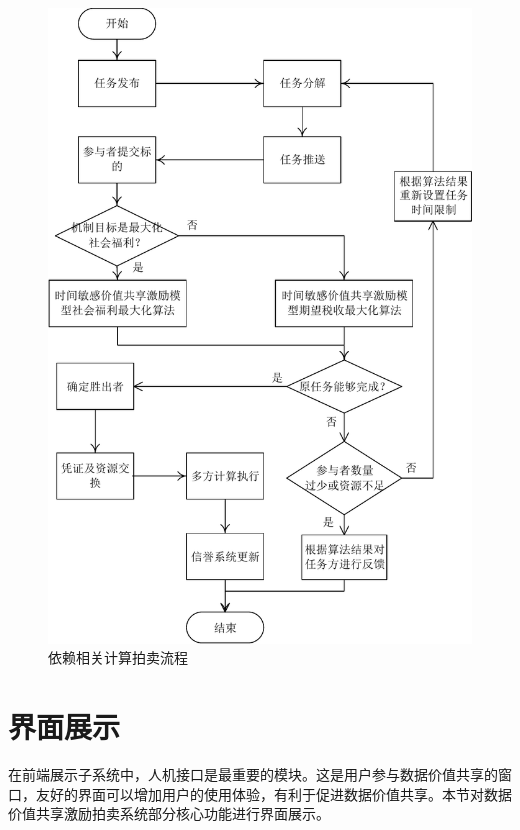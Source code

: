 \documentclass[promaster]{thesis-uestc}
\begin{document}
\begin{figure}[p]
    \includegraphics{pic/yilaixiangguan.pdf}
    \caption{依赖相关计算拍卖流程}
    \label{yilailiucheng}
\end{figure}

\FloatBarrier

\section{界面展示}

在前端展示子系统中，人机接口是最重要的模块。这是用户参与数据价值共享的窗口，友好的界面可以增加用户的使用体验，有利于促进数据价值共享。本节对数据价值共享激励拍卖系统部分核心功能进行界面展示。

%
%
\end{document}
